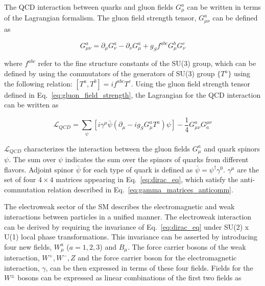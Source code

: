 The QCD interaction between quarks and gluon fields $G_{\mu}^{a}$ can be written in terms of the Lagrangian formalism.
The gluon field strength tensor, $G_{\mu\nu}^a$ can be defined as

\begin{equation}
    G_{\mu\nu}^a = \partial_{\mu}G_{\nu}^a - \partial_{\nu}G_{\mu}^a + g_{S} f^{abc} G_{\mu}^{b} G_{\nu}^{c}
    \label{eq:gluon_field_strength}
\end{equation}

where $f^{abc}$ refer to the fine structure constants of the SU(3) group, which can be defined by using the
commutators of the generators of SU(3) group $\{ T^{a} \}$ using the following relation: 
$[ T^{a}, T^{b} ] = i f^{abc} T^{c}$. 
Using the gluon field strength tensor defined in Eq.~\ref{eq:gluon_field_strength}, 
the Lagrangian for the QCD interaction can be written as


\begin{equation}
    \mathcal{L}_{QCD} = \sum_{\psi} \left[ i \gamma^{\mu} \bar{\psi} \left( \partial_{\mu} - i g_{S} G_{\mu}^{a} T^{a} \right) \psi \right] - \frac{1}{4} G_{\mu\nu}^{a} G^{\mu\nu}_{a}
\end{equation}

$\mathcal{L}_{QCD}$ characterizes the interaction between the gluon fields $G_{\mu}^{a}$ and quark spinors $\psi$.
The sum over $\psi$ indicates the sum over the spinors of quarks from different flavors.
Adjoint spinor $\bar{\psi}$ for each type of quark is defined as $\bar{\psi} = \psi^{\dag} \gamma^0$.
$\gamma^{\mu}$ are the set of four $4 \times 4$ matrices appearing in Eq.~\ref{eq:dirac_eq}, which satisfy the
anti-commutation relation described in Eq.~\ref{eq:gamma_matrices_anticomm}. 

The electroweak sector of the SM describes the electromagnetic and weak interactions between particles in a unified manner. The electroweak interaction
can be derived by requiring the invariance of Eq.~\ref{eq:dirac_eq} under SU(2) x U(1) local phase transformations. 
This invariance can be asserted by introducing four
new fields, $W_{\mu}^{a}$ ($a = 1, 2, 3$) and $B_{\mu}$. The force carrier bosons of the weak interaction, $W^{+}, W^{-}, Z$ and the force carrier boson 
for the electromagnetic interaction, $\gamma$, can be then expressed in terms of these four fields. Fields for the $W^{\pm}$ bosons can be expressed as
linear combinations of the first two fields as

